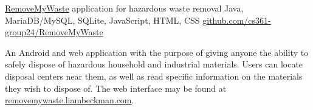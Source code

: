 \showoff
{\href{https://liambeckman.com/code/matriz}{RemoveMyWaste}}
{application for hazardous waste removal}
{Java, MariaDB/MySQL, SQLite, JavaScript, HTML, CSS}
{\href{https://github.com/cs361-group24/RemoveMyWaste}{github.com/cs361-group24/RemoveMyWaste}}

An Android and web application with the purpose of giving anyone the ability to safely dispose of hazardous household and industrial materials. Users can locate disposal centers near them, as well as read specific information on the materials they wish to dispose of. The web interface may be found at \textcolor{my-blue}{\href{https://removemywaste.liambeckman.com}{removemywaste.liambeckman.com}}.

\myBreak
